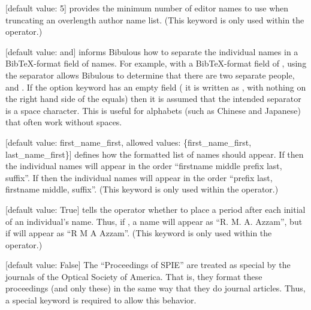 \documentclass[letterpaper,10pt,english]{sphinxmanual}
\begin{document}
 {[}default value: 5{]} provides the minimum number of editor names to use when truncating an overlength author name list. (This keyword is only used within the  operator.)

 {[}default value: and{]} informs Bibulous how to separate the individual names in a BibTeX-format field of names. For example, with a BibTeX-format field of , using the separator  allows Bibulous to determine that there are two separate people,  and . If the option keyword has an empty field ( it is written as , with nothing on the right hand side of the equals) then it is assumed that the intended separator is a space character. This is useful for alphabets (such as Chinese and Japanese) that often work without spaces.

 {[}default value: first\_name\_first, allowed values: \{first\_name\_first, last\_name\_first\}{]} defines how the formatted list of names should appear. If  then the individual names will appear in the order “firstname middle prefix last, suffix”. If  then the individual names will appear in the order “prefix last, firstname middle, suffix”. (This keyword is only used within the  operator.)

 {[}default value: True{]} tells the  operator whether to place a period after each initial of an individual’s name. Thus, if , a name will appear as “R. M. A. Azzam”, but if  will appear as “R M A Azzam”. (This keyword is only used within the  operator.)

 {[}default value: False{]} The “Proceedings of SPIE” are treated as special by the journals of the Optical Society of America. That is, they format these proceedings (and only these) in the same way that they do journal articles. Thus, a special keyword is required to allow this behavior.
\end{document}
